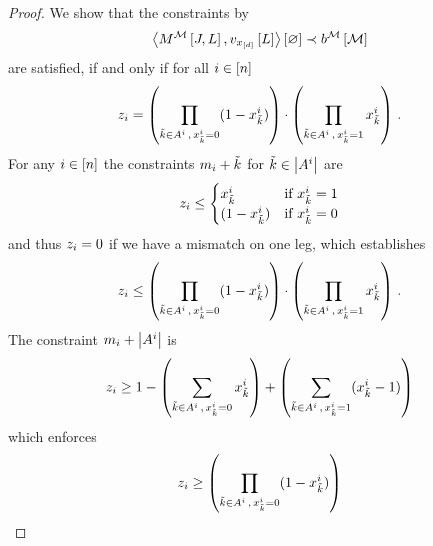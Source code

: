 \begin{proof}
    We show that the constraints by
    \[ \left\langle M^{\mathcal{M}}\left[J,L\right],v_{x_{[d]}}\left[L\right]\right\rangle \left[ \varnothing \right] \prec b^{\mathcal{M}}\left[\mathcal{M}\right] \]
    are satisfied, if and only if for all $i\in[n]$
    \[ z_{i}
    = \left( \prod_{\tilde{k}\in A^{i} \, , \,  x_{\tilde{k}}^i = 0} (1 - x_{\tilde{k}}^i) \right)
    \cdot \left( \prod_{\tilde{k}\in A^{i} \, , \,  x_{\tilde{k}}^i = 1}  x_{\tilde{k}}^i \right) \, .
    \]
    For any $i\in[n]$ the constraints $m_{i}+\tilde{k}$ for $\tilde{k}\in\left|A^{i}\right|$ are
    \begin{align*}
        z_{i} \leq
        \begin{cases}
            x_{\tilde{k}}^i  & \text{if } x_{\tilde{k}}^i = 1 \\
            (1- x_{\tilde{k}}^i ) & \text{if } x_{\tilde{k}}^i = 0 \\
        \end{cases}
    \end{align*}
    and thus $z_{i}=0$ if we have a mismatch on one leg, which establishes
    \[ z_{i}
    \leq \left( \prod_{\tilde{k}\in A^{i} \, , \,  x_{\tilde{k}}^i = 0} (1 - x_{\tilde{k}}^i) \right)
    \cdot \left( \prod_{\tilde{k}\in A^{i} \, , \,  x_{\tilde{k}}^i = 1}  x_{\tilde{k}}^i \right) \, .
    \]
    The constraint $m_{i}+\left|A^{i}\right|$ is
    \begin{align*}
        z_{i} \geq 1 -
        \left( \sum_{\tilde{k}\in A^{i} \, , \,  x_{\tilde{k}}^i = 0} x_{\tilde{k}}^i \right)
        + \left( \sum_{\tilde{k}\in A^{i} \, , \,  x_{\tilde{k}}^i = 1}  (x_{\tilde{k}}^i - 1 )\right)
    \end{align*}
    which enforces
    \[ z_{i}
    \geq \left( \prod_{\tilde{k}\in A^{i} \, , \,  x_{\tilde{k}}^i = 0} (1 - x_{\tilde{k}}^i) \right)
\]
\end{proof}

